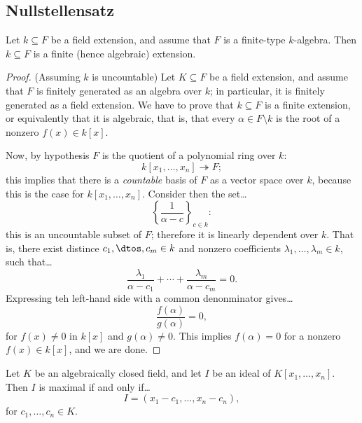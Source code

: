 \subsection{Nullstellensatz}

\begin{theorem}
Let $k \subseteq F$ be a field extension, and assume that $F$ is a finite-type $k$-algebra. Then $k \subseteq F$ is a finite (hence algebraic) extension.
\end{theorem}

\begin{proof}(Assuming $k$ is uncountable)\newline
Let $K \subseteq F$ be a field extension, and assume that $F$ is finitely generated as an algebra over $k$; in particular, it is finitely
generated as a field extension. We have to prove that $k \subseteq F$ is a finite extension, or equivalently that it is algebraic, that is, that
every $\alpha \in F \setminus k$ is the root of a nonzero $f(x) \in k[x]$.

Now, by hypothesis $F$ is the quotient of a polynomial ring over $k$:
$$k[x_1,\dots,x_n] \twoheadrightarrow F;$$
this implies that there is a \emph{countable} basis of $F$ as a vector space over $k$, because this is the case for $k[x_1,\dots,x_n]$. Consider
then the set\dots
$$\left\{ \frac{1}{\alpha - c} \right\}_{c \in k}:$$
this is an uncountable subset of $F$; therefore it is linearly dependent over $k$. That is, there exist distince $c_1, \dtos, c_m \in k$ and nonzero
coefficients $\lambda_1,\dots,\lambda_m \in k$, such that\dots
$$\frac{\lambda_1}{\alpha - c_1} + \cdots + \frac{\lambda_m}{\alpha - c_m} = 0.$$
Expressing teh left-hand side with a common denonminator gives\dots
$$\frac{f(\alpha)}{g(\alpha)} = 0,$$
for $f(x) \neq 0$ in $k[x]$ and $g(\alpha) \neq 0$. This implies $f(\alpha) = 0$ for a nonzero $f(x) \in k[x]$, and we are done.
\end{proof}

\begin{corollary}
Let $K$ be an algebraically closed field, and let $I$ be an ideal of $K[x_1,\dots,x_n]$. Then $I$ is maximal if and only if\dots
$$I = (x_1 - c_1, \dots, x_n - c_n),$$
for $c_1,\dots,c_n \in K$.
\end{corollary}